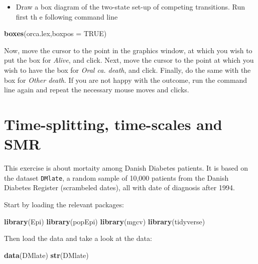 \documentclass[
]{book}
\newenvironment{Shaded}{\begin{snugshade}}{\end{snugshade}}
\newcommand{\AttributeTok}[1]{\textcolor[rgb]{0.13,0.29,0.53}{#1}}
\newcommand{\ConstantTok}[1]{\textcolor[rgb]{0.56,0.35,0.01}{#1}}
\newcommand{\FunctionTok}[1]{\textcolor[rgb]{0.13,0.29,0.53}{\textbf{#1}}}
\newcommand{\NormalTok}[1]{#1}
\providecommand{\tightlist}{%
  \setlength{\itemsep}{0pt}\setlength{\parskip}{0pt}}
\begin{document}
\begin{itemize}
\tightlist
\item
  Draw a box diagram of the two-state set-up of competing transitions. Run first th e following command line
\end{itemize}

\begin{Shaded}
\begin{Highlighting}[]
\FunctionTok{boxes}\NormalTok{(orca.lex,}\AttributeTok{boxpos =} \ConstantTok{TRUE}\NormalTok{)}
\end{Highlighting}
\end{Shaded}

Now, move the cursor to the point in the graphics window, at which you wish to put the box for \emph{Alive}, and click. Next, move
the cursor to the point at which you wish to have the box for \emph{Oral ca. death}, and click. Finally, do the same with the box for \emph{Other death}.
If you are not happy with the outcome, run the command line again and repeat the necessary mouse moves and clicks.

\chapter{Time-splitting, time-scales and SMR}\label{time-splitting-time-scales-and-smr}

This exercise is about mortaity among Danish Diabetes patients. It is
based on the dataset \texttt{DMlate}, a random sample of 10,000
patients from the Danish Diabetes Register (scrambeled dates), all
with date of diagnosis after 1994.

Start by loading the relevant packages:

\begin{Shaded}
\begin{Highlighting}[]
\FunctionTok{library}\NormalTok{(Epi)}
\FunctionTok{library}\NormalTok{(popEpi)}
\FunctionTok{library}\NormalTok{(mgcv)}
\FunctionTok{library}\NormalTok{(tidyverse)}
\end{Highlighting}
\end{Shaded}

Then load the data and take a look at the data:

\begin{Shaded}
\begin{Highlighting}[]
\FunctionTok{data}\NormalTok{(DMlate)}
\FunctionTok{str}\NormalTok{(DMlate)}
\end{Highlighting}
\end{Shaded}
\end{document}
